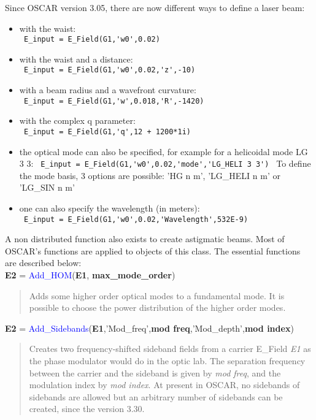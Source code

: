 Since OSCAR version 3.05, there are now different ways to define a laser beam:
\begin{itemize}
  \item with the waist: \\
        \verb? E_input = E_Field(G1,'w0',0.02) ?
  \item with the waist and a distance: \\
        \verb? E_input = E_Field(G1,'w0',0.02,'z',-10) ?
  \item with a beam radius and a wavefront curvature: \\
        \verb? E_input = E_Field(G1,'w',0.018,'R',-1420) ?
  \item with the complex q parameter: \\
        \verb? E_input = E_Field(G1,'q',12 + 1200*1i) ?
  \item the optical mode can also be specified, for example for a helicoidal mode LG 3 3:
        \verb? E_input = E_Field(G1,'w0',0.02,'mode','LG_HELI 3 3') ?
        To define the mode basis, 3 options are possible: 'HG n m', 'LG\_HELI n m' or 'LG\_SIN n m'
  \item one can also specify the wavelength (in meters):\\
        \verb? E_input = E_Field(G1,'w0',0.02,'Wavelength',532E-9) ?
\end{itemize}
A non distributed function also exists to create astigmatic beams. Most of OSCAR's functions are applied to objects of this class. The essential functions are described below:\\

\noindent \textbf{E2} = \textcolor{blue}{Add\_HOM}(\textbf{E1}, \textbf{max\_mode\_order})
\vspace*{-0.2cm}
\begin{quote}
Adds some higher order optical modes to a fundamental mode. It is possible to choose the power distribution of the higher order modes.
\end{quote}

\noindent \textbf{E2} = \textcolor{blue}{Add\_Sidebands}(\textbf{E1},'Mod\_freq',\textbf{mod freq},'Mod\_depth',\textbf{mod index})
\vspace*{-0.2cm}
\begin{quote}
Creates two frequency-shifted sideband fields from a carrier E\_Field \textsl{E1} as the phase modulator would do in the optic lab. The separation frequency between the carrier and the sideband is given by \textsl{mod freq}, and the modulation index by \textsl{mod index}. At present in OSCAR, no sidebands of sidebands are allowed but an arbitrary number of sidebands can be created, since the version 3.30.
\end{quote}

